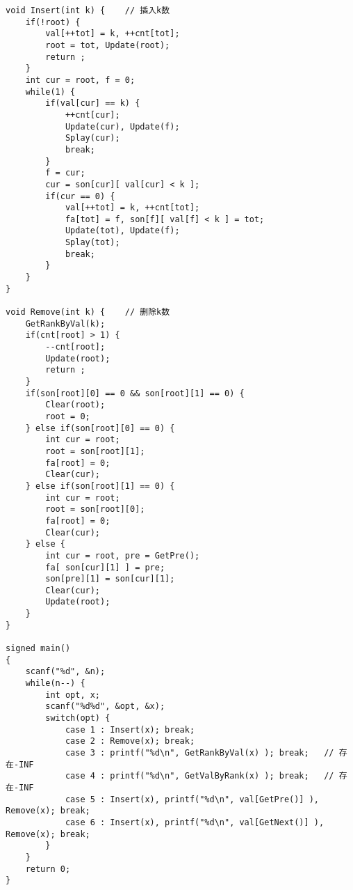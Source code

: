 \begin{lstlisting}
void Insert(int k) {	// 插入k数
	if(!root) {
		val[++tot] = k, ++cnt[tot];
		root = tot, Update(root);
		return ;
	}
	int cur = root, f = 0;
	while(1) {
		if(val[cur] == k) {
			++cnt[cur];
			Update(cur), Update(f);
			Splay(cur);
			break;
		}
		f = cur;
		cur = son[cur][ val[cur] < k ];
		if(cur == 0) {
			val[++tot] = k, ++cnt[tot];
			fa[tot] = f, son[f][ val[f] < k ] = tot;
			Update(tot), Update(f);
			Splay(tot);
			break;
		}
	}
}

void Remove(int k) {	// 删除k数 
	GetRankByVal(k);
	if(cnt[root] > 1) {
		--cnt[root];
		Update(root);
		return ;
	}
	if(son[root][0] == 0 && son[root][1] == 0) {
		Clear(root);
		root = 0;
	} else if(son[root][0] == 0) {
		int cur = root;
		root = son[root][1];
		fa[root] = 0;
		Clear(cur);
	} else if(son[root][1] == 0) {
		int cur = root;
		root = son[root][0];
		fa[root] = 0;
		Clear(cur);
	} else {
		int cur = root, pre = GetPre();
		fa[ son[cur][1] ] = pre;
		son[pre][1] = son[cur][1];
		Clear(cur);
		Update(root);
	}
}

signed main()
{
	scanf("%d", &n);
	while(n--) {
		int opt, x;
		scanf("%d%d", &opt, &x);
		switch(opt) {
			case 1 : Insert(x); break;
			case 2 : Remove(x); break;
			case 3 : printf("%d\n", GetRankByVal(x) ); break;	// 存在-INF 
			case 4 : printf("%d\n", GetValByRank(x) ); break;	// 存在-INF 
			case 5 : Insert(x), printf("%d\n", val[GetPre()] ), Remove(x); break;
			case 6 : Insert(x), printf("%d\n", val[GetNext()] ), Remove(x); break;
		}
	}
	return 0;
}
\end{lstlisting}

